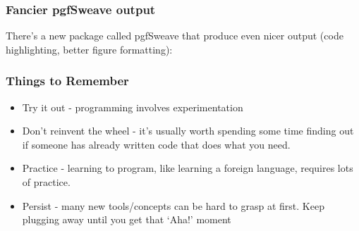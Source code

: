 \documentclass{beamer}
\begin{document}
\begin{frame}
  \frametitle{Fancier pgfSweave output}

There's a new package called pgfSweave that produce even nicer output (code highlighting, better figure formatting):

\begin{center}
\end{center}


\end{frame}



\begin{frame}
  \frametitle{Things to Remember}

\begin{itemize}

 \item Try it out - programming involves experimentation
 \item Don't reinvent the wheel - it's usually worth spending some time finding out if someone has already written code that does what you need.
 \item Practice - learning to program, like learning a foreign language, requires lots of practice.
 \item Persist - many new tools/concepts can be hard to grasp at first. Keep plugging away until you get that `Aha!' moment
\end{itemize}


\end{frame}
\end{document}
